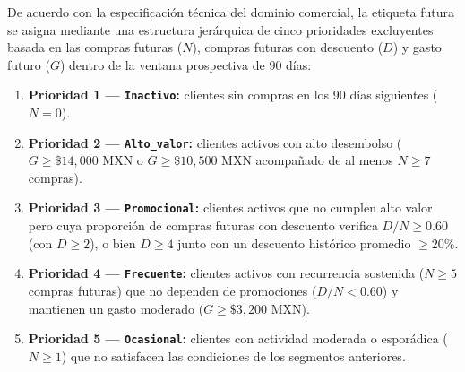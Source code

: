 \documentclass[11pt,a4paper]{article}
\newcommand{\code}[1]{\texttt{\small #1}}
\begin{document}
De acuerdo con la especificación técnica del dominio comercial, la etiqueta futura se asigna mediante una estructura jerárquica de cinco prioridades excluyentes basada en las compras futuras ($N$), compras futuras con descuento ($D$) y gasto futuro ($G$) dentro de la ventana prospectiva de $90$ días:
\begin{enumerate}[noitemsep]
    \item \textbf{Prioridad 1 --- \code{Inactivo}:} clientes sin compras en los 90 días siguientes ($N = 0$).
    \item \textbf{Prioridad 2 --- \code{Alto\_valor}:} clientes activos con alto desembolso ($G \ge \$14{,}000$ MXN o $G \ge \$10{,}500$ MXN acompañado de al menos $N \ge 7$ compras).
    \item \textbf{Prioridad 3 --- \code{Promocional}:} clientes activos que no cumplen alto valor pero cuya proporción de compras futuras con descuento verifica $D/N \ge 0.60$ (con $D \ge 2$), o bien $D \ge 4$ junto con un descuento histórico promedio $\ge 20\%$.
    \item \textbf{Prioridad 4 --- \code{Frecuente}:} clientes activos con recurrencia sostenida ($N \ge 5$ compras futuras) que no dependen de promociones ($D/N < 0.60$) y mantienen un gasto moderado ($G \ge \$3{,}200$ MXN).
    \item \textbf{Prioridad 5 --- \code{Ocasional}:} clientes con actividad moderada o esporádica ($N \ge 1$) que no satisfacen las condiciones de los segmentos anteriores.
\end{enumerate}
\end{document}
